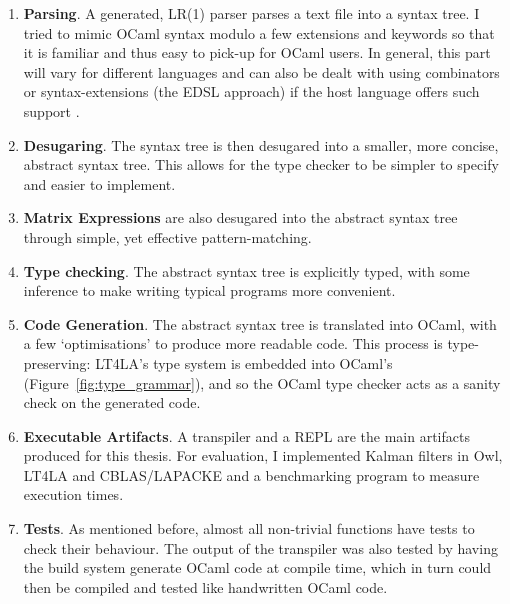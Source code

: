 \begin{enumerate}

    \item \textbf{Parsing}. A generated, LR(1) parser parses a text file into a
        syntax tree. I tried to mimic OCaml syntax modulo a few extensions and
        keywords so that it is familiar and thus easy to pick-up for OCaml
        users. In general, this part will vary for different languages and can
        also be dealt with using combinators or syntax-extensions (the EDSL
        approach) if the host language offers such support .

    \item \textbf{Desugaring}. The syntax tree is then desugared into a
        smaller, more concise, abstract syntax tree. This allows for the type
        checker to be simpler to specify and easier to implement. 

    \item \textbf{Matrix Expressions} are also desugared into the abstract
        syntax tree through simple, yet effective pattern-matching.

    \item \textbf{Type checking}. The abstract syntax tree is explicitly typed,
        with some inference to make writing typical programs more convenient.

    \item \textbf{Code Generation}. The abstract syntax tree is translated into
        OCaml, with a few `optimisations' to produce more readable code. This
        process is type-preserving: LT4LA's type system is embedded into
        OCaml's (Figure~\ref{fig:type_grammar}), and so the OCaml type checker
        acts as a sanity check on the generated code.

    \item \textbf{Executable Artifacts}. A transpiler and a REPL are the main
        artifacts produced for this thesis. For evaluation, I implemented
        Kalman filters in Owl, LT4LA and CBLAS/LAPACKE and a benchmarking
        program to measure execution times.

    \item \textbf{Tests}. As mentioned before, almost all non-trivial functions
        have tests to check their behaviour. The output of the transpiler was
        also tested by having the build system generate OCaml code at compile
        time, which in turn could then be compiled and tested like handwritten
        OCaml code.

\end{enumerate}

